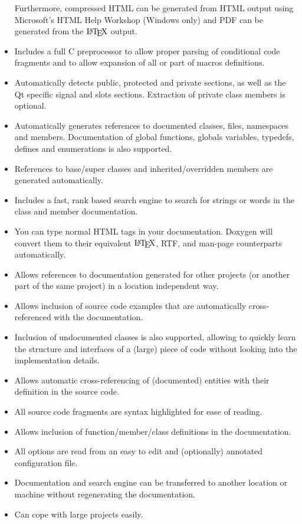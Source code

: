 \begin{itemize}
 Furthermore, compressed HTML can be generated from HTML output using Microsoft's HTML Help Workshop (Windows only) and PDF can be generated from the $\mbox{\LaTeX}$ output. \item Includes a full C preprocessor to allow proper parsing of conditional code fragments and to allow expansion of all or part of macros definitions. \item Automatically detects public, protected and private sections, as well as the Qt specific signal and slots sections. Extraction of private class members is optional. \item Automatically generates references to documented classes, files, namespaces and members. Documentation of global functions, globals variables, typedefs, defines and enumerations is also supported. \item References to base/super classes and inherited/overridden members are generated automatically. \item Includes a fast, rank based search engine to search for strings or words in the class and member documentation. \item You can type normal HTML tags in your documentation. Doxygen will convert them to their equivalent $\mbox{\LaTeX}$, RTF, and man-page counterparts automatically. \item Allows references to documentation generated for other projects (or another part of the same project) in a location independent way. \item Allows inclusion of source code examples that are automatically cross-referenced with the documentation. \item Inclusion of undocumented classes is also supported, allowing to quickly learn the structure and interfaces of a (large) piece of code without looking into the implementation details. \item Allows automatic cross-referencing of (documented) entities with their definition in the source code. \item All source code fragments are syntax highlighted for ease of reading. \item Allows inclusion of function/member/class definitions in the documentation. \item All options are read from an easy to edit and (optionally) annotated configuration file. \item Documentation and search engine can be transferred to another location or machine without regenerating the documentation. \item Can cope with large projects easily. \end{itemize}


